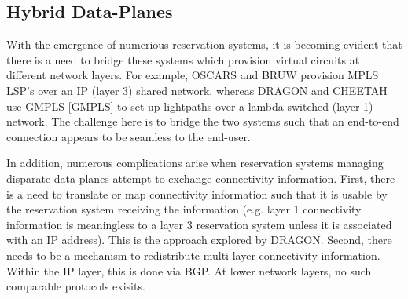 \documentclass[conference]{IEEEtran}
\begin{document}
\subsection{Hybrid Data-Planes}
With the emergence of numerious reservation systems, it is becoming evident 
that there is a need to bridge these systems which provision virtual circuits 
at different network layers.
For example, OSCARS and BRUW provision MPLS LSP's over an IP (layer 3) shared 
network, whereas DRAGON and CHEETAH use
GMPLS [GMPLS] to set up lightpaths over a lambda switched (layer 1) network.
The challenge here is to bridge the two systems such
that an end-to-end connection appears to be seamless to the end-user.

In addition, numerous complications arise when reservation systems managing 
disparate data planes attempt to exchange connectivity information.  First, 
there is a need to translate or map connectivity information such that it is 
usable by the reservation system receiving the information (e.g. layer 1 
connectivity information is meaningless to a layer 3 reservation system unless 
it is associated with an IP address).  This is the approach explored by DRAGON.
Second, there needs to be a mechanism to redistribute multi-layer connectivity 
information. Within the IP layer, this is done via BGP.  At lower network 
layers, no such comparable protocols exisits.


%


%
\end{document}
